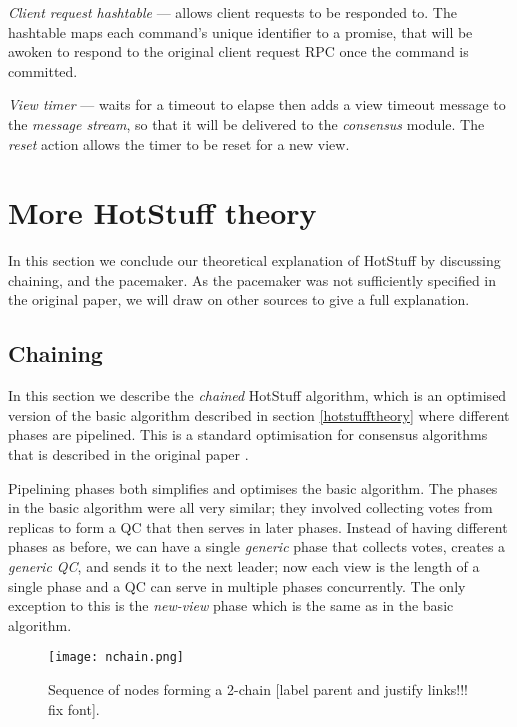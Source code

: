 \begin{description}
	\item \textit{Client request hashtable} --- allows client requests to be responded to. The hashtable maps each command's unique identifier to a promise, that will be awoken to respond to the original client request RPC once the command is committed.
	\item \textit{View timer} --- waits for a timeout to elapse then adds a view timeout message to the \textit{message stream}, so that it will be delivered to the \textit{consensus} module. The \textit{reset} action allows the timer to be reset for a new view.
\end{description}

\section{More HotStuff theory} \label{moretheory}
In this section we conclude our theoretical explanation of HotStuff by discussing chaining, and the pacemaker. As the pacemaker was not sufficiently specified in the original paper, we will draw on other sources to give a full explanation.

\subsection{Chaining} \label{chaining}

In this section we describe the \textit{chained} HotStuff algorithm, which is an optimised version of the basic algorithm described in section \ref{hotstufftheory} where different phases are pipelined. This is a standard optimisation for consensus algorithms that is described in the original paper \cite{yinHotStuffBFTConsensus2019}.

Pipelining phases both simplifies and optimises the basic algorithm. The phases in the basic algorithm were all very similar; they involved collecting votes from replicas to form a QC that then serves in later phases. Instead of having different phases as before, we can have a single \textit{generic} phase that collects votes, creates a \textit{generic QC}, and sends it to the next leader; now each view is the length of a single phase and a QC can serve in multiple phases concurrently. The only exception to this is the \textit{new-view} phase which is the same as in the basic algorithm.

\begin{figure}[h!]
\centering
\texttt{[image: nchain.png]}
\caption{Sequence of nodes forming a 2-chain [label parent and justify links!!! fix font].}
\label{nchain}
\end{figure}

